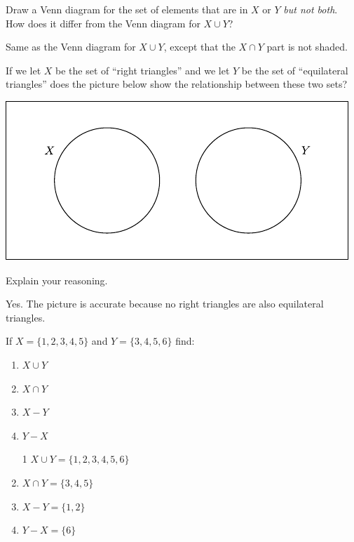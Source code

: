 \documentclass{ximera}
\begin{document}
\begin{problem}
Draw a Venn diagram for the set of elements that are in $X$ or $Y$ \emph{but not both}. 
How does it differ from the Venn diagram for $X\cup Y$?  
\begin{freeResponse}
Same as the Venn diagram for $X\cup Y$, except that the $X\cap Y$ part is not shaded.  
\end{freeResponse}
\end{problem}

\begin{problem}
If we let $X$ be the set of ``right triangles'' and we let $Y$ be the set of ``equilateral triangles'' does the picture below show the relationship between these two sets?
\begin{image}
\includegraphics[scale=0.8]{set4.pdf}
\end{image}
Explain your reasoning.
\begin{freeResponse}
Yes.  The picture is accurate because no right triangles are also equilateral triangles.  
\end{freeResponse}
\end{problem}

\begin{problem}
If $X = \{1,2,3,4,5\}$ and $Y = \{3,4,5,6\}$ find:
\begin{enumerate}
\item $X\cup Y$
\item $X\cap Y$
\item $X-Y$
\item $Y-X$
\end{enumerate}
\begin{freeResponse}
\begin{enumerate}
\item[1] $X\cup Y = \{1,2,3,4,5,6\}$
\item $X\cap Y = \{3,4,5\}$
\item $X-Y = \{1,2\}$
\item $Y-X = \{6\}$
\end{enumerate}
\end{freeResponse}
\end{problem}
\end{document}
